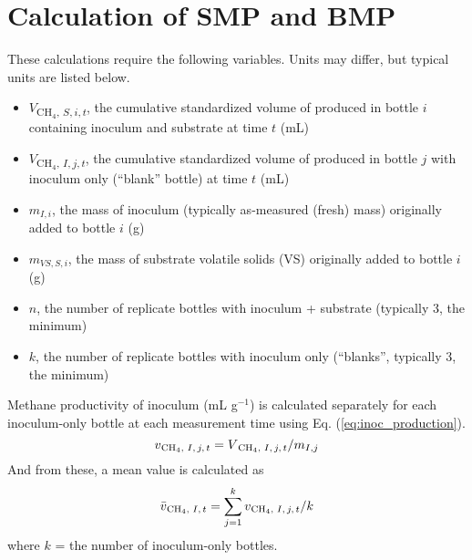 \documentclass[]{article}
\begin{document}
\section{Calculation of SMP and BMP}
These calculations require the following variables.
Units may differ, but typical units are listed below.
\begin{itemize}
  \item $V$\textsubscript{{CH$_4$, $S, i, t$}}, the cumulative standardized volume of  produced in bottle $i$ containing inoculum and substrate at time $t$ (mL)
  \item $V$\textsubscript{{CH$_4$, $I, j, t$}}, the cumulative standardized volume of  produced in bottle $j$ with inoculum only (``blank'' bottle) at time $t$ (mL)
  \item $m_{I, i}$, the mass of inoculum (typically as-measured (fresh) mass) originally added to bottle $i$ (g)
  \item $m_{VS, S, i}$, the mass of substrate volatile solids (VS) originally added to bottle $i$ (g)
  \item $n$, the number of replicate bottles with inoculum + substrate (typically 3, the minimum)
  \item $k$, the number of replicate bottles with inoculum only (``blanks'', typically 3, the minimum)
\end{itemize}

Methane productivity of inoculum (mL g$^{-1}$) is calculated separately for each inoculum-only bottle at each measurement time using Eq. (\ref{eq:inoc_production}).
\begin{equation}
  \label{eq:inoc_production}
  v\textsubscript{{CH$_4$, $I, j, t$}} = V\textsubscript{{CH$_4$, $I, j, t$}} / m_{I, j} 
\end{equation}
And from these, a mean value is calculated as 
\begin{equation}
  \label{eq:inoc_productivity}
  \bar{v}\textsubscript{{CH$_4$, $I, t$}} = \sum_{j = 1} ^k v\textsubscript{{CH$_4$, $I, j, t$}} / k
\end{equation}
where $k$ = the number of inoculum-only bottles.
\end{document}
